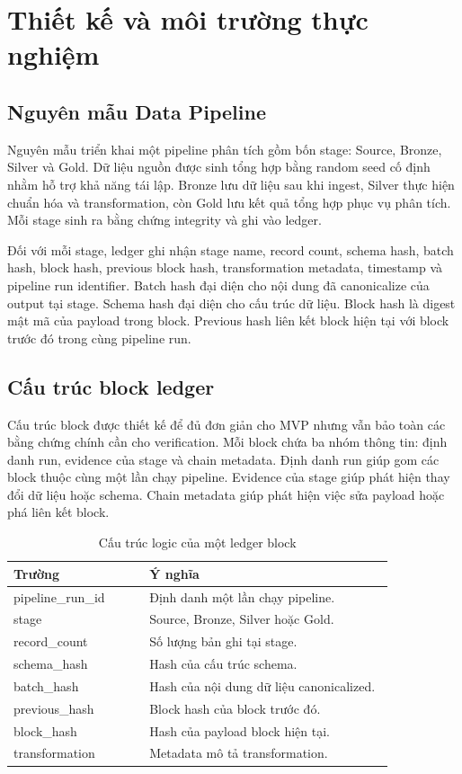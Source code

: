 \section{Thiết kế và môi trường thực nghiệm}

\subsection{Nguyên mẫu Data Pipeline}

Nguyên mẫu triển khai một pipeline phân tích gồm bốn stage: Source, Bronze, Silver và Gold. Dữ liệu nguồn được sinh tổng hợp bằng random seed cố định nhằm hỗ trợ khả năng tái lập. Bronze lưu dữ liệu sau khi ingest, Silver thực hiện chuẩn hóa và transformation, còn Gold lưu kết quả tổng hợp phục vụ phân tích. Mỗi stage sinh ra bằng chứng integrity và ghi vào ledger.

Đối với mỗi stage, ledger ghi nhận stage name, record count, schema hash, batch hash, block hash, previous block hash, transformation metadata, timestamp và pipeline run identifier. Batch hash đại diện cho nội dung đã canonicalize của output tại stage. Schema hash đại diện cho cấu trúc dữ liệu. Block hash là digest mật mã của payload trong block. Previous hash liên kết block hiện tại với block trước đó trong cùng pipeline run.

\subsection{Cấu trúc block ledger}

Cấu trúc block được thiết kế để đủ đơn giản cho MVP nhưng vẫn bảo toàn các bằng chứng chính cần cho verification. Mỗi block chứa ba nhóm thông tin: định danh run, evidence của stage và chain metadata. Định danh run giúp gom các block thuộc cùng một lần chạy pipeline. Evidence của stage giúp phát hiện thay đổi dữ liệu hoặc schema. Chain metadata giúp phát hiện việc sửa payload hoặc phá liên kết block.

\begin{table}[t]
\caption{Cấu trúc logic của một ledger block}
\centering
\begin{tabular}{p{0.30\linewidth}p{0.54\linewidth}}
\toprule
\textbf{Trường} & \textbf{Ý nghĩa} \\
\midrule
pipeline\_run\_id & Định danh một lần chạy pipeline. \\
stage & Source, Bronze, Silver hoặc Gold. \\
record\_count & Số lượng bản ghi tại stage. \\
schema\_hash & Hash của cấu trúc schema. \\
batch\_hash & Hash của nội dung dữ liệu canonicalized. \\
previous\_hash & Block hash của block trước đó. \\
block\_hash & Hash của payload block hiện tại. \\
transformation & Metadata mô tả transformation. \\
\bottomrule
\end{tabular}
\label{tab:block_structure}
\end{table}

